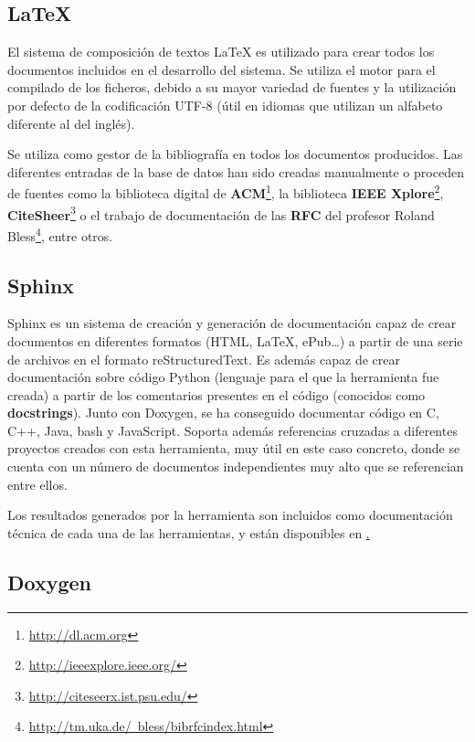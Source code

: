 \subsection{{\LaTeX}}

El sistema de composición de textos {\LaTeX} es utilizado para crear todos los documentos incluidos en el desarrollo del sistema. Se utiliza el motor {\XeLaTeX} para el compilado de los ficheros, debido a su mayor variedad de fuentes y la utilización por defecto de la codificación UTF-8 (útil en idiomas que utilizan un alfabeto diferente al del inglés). 

Se utiliza {\BibTeX} como gestor de la bibliografía en todos los documentos producidos. Las diferentes entradas de la base de datos han sido creadas manualmente o proceden de fuentes como la biblioteca digital de \textbf{ACM}\footnote{\href{http://dl.acm.org}{http://dl.acm.org}}, la biblioteca \textbf{IEEE Xplore}\footnote{\href{http://ieeexplore.ieee.org/}{http://ieeexplore.ieee.org/}}, \textbf{CiteSheer}\footnote{\href{http://citeseerx.ist.psu.edu/}{http://citeseerx.ist.psu.edu/}} o el trabajo de documentación de las \textbf{RFC} del profesor Roland Bless\footnote{\href{http://tm.uka.de/~bless/bibrfcindex.html}{http://tm.uka.de/~bless/bibrfcindex.html}}, entre otros.

\subsection{Sphinx}

Sphinx es un sistema de creación y generación de documentación capaz de crear documentos en diferentes formatos (HTML, \LaTeX, ePub\dots) a partir de una serie de archivos en el formato reStructuredText. Es además capaz de crear documentación sobre código Python (lenguaje para el que la herramienta fue creada) a partir de los comentarios presentes en el código (conocidos como \textbf{docstrings}). Junto con Doxygen, se ha conseguido documentar código en C, C++, Java, bash y JavaScript. Soporta además referencias cruzadas a diferentes proyectos creados con esta herramienta, muy útil en este caso concreto, donde se cuenta con un número de documentos independientes muy alto que se referencian entre ellos.

Los resultados generados por la herramienta son incluidos como documentación técnica de cada una de las herramientas, y están disponibles en \href{marcopolo.martinarroyo.net}.

\subsection{Doxygen}

